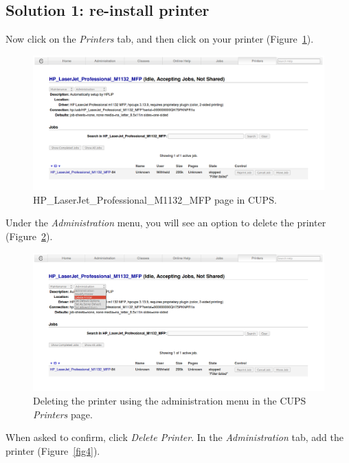 \documentclass[12pt, a4paper]{article}
\begin{document}
\subsection*{Solution 1: re-install printer}

Now click on the \emph{Printers} tab, and then click on your printer (Figure~\ref{fig2}).

\newpage
\begin{figure}[h]
  \centering
  \includegraphics[width=1\textwidth]{imgs/filter-failed-2.png}
  \caption{HP\_LaserJet\_Professional\_M1132\_MFP page in CUPS.}
  \label{fig2}
\end{figure}

\noindent Under the \emph{Administration} menu, you will see an option to delete the printer (Figure~\ref{fig3}).

\begin{figure}[!h]
  \centering
  \includegraphics[width=1\textwidth]{imgs/filter-failed-3.png}
  \caption{Deleting the printer using the administration menu in the CUPS \emph{Printers} page.}
  \label{fig3}
\end{figure}

\noindent When asked to confirm, click \emph{Delete Printer}. In the \emph{Administration} tab, add the printer (Figure~\ref{fig4}). 
\end{document}
